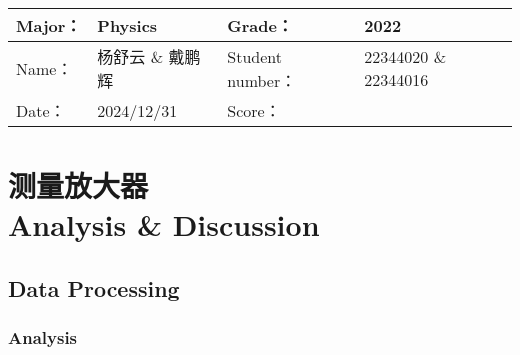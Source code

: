 
\begin{table}
	\renewcommand\arraystretch{1.7}
	\begin{tabularx}{\textwidth}{|X|X|X|X|}
		\hline
		Major：& Physics &Grade：& 2022\\
		\hline
		Name： & 杨舒云 \& 戴鹏辉 & Student number：& 22344020 \& 22344016\\
		\hline
		Date：& 2024/12/31 & Score： &\\
		\hline
	\end{tabularx}
\end{table}
\section{测量放大器 \\ Analysis \& Discussion}


\subsection{Data Processing}

\subsubsection{Analysis}

